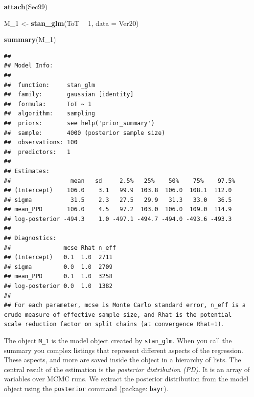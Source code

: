 \documentclass[]{svmono}
\newenvironment{Shaded}{\begin{snugshade}}{\end{snugshade}}
\newcommand{\KeywordTok}[1]{\textcolor[rgb]{0.13,0.29,0.53}{\textbf{#1}}}
\newcommand{\DataTypeTok}[1]{\textcolor[rgb]{0.13,0.29,0.53}{#1}}
\newcommand{\DecValTok}[1]{\textcolor[rgb]{0.00,0.00,0.81}{#1}}
\newcommand{\StringTok}[1]{\textcolor[rgb]{0.31,0.60,0.02}{#1}}
\newcommand{\OperatorTok}[1]{\textcolor[rgb]{0.81,0.36,0.00}{\textbf{#1}}}
\newcommand{\NormalTok}[1]{#1}
\theoremstyle{definition}
\theoremstyle{definition}
\theoremstyle{definition}
\theoremstyle{remark}
\begin{document}
\begin{Shaded}
\begin{Highlighting}[]
\KeywordTok{attach}\NormalTok{(Sec99)}
\end{Highlighting}
\end{Shaded}

\begin{Shaded}
\begin{Highlighting}[]
\NormalTok{M_}\DecValTok{1}\NormalTok{ <-}\StringTok{ }\KeywordTok{stan_glm}\NormalTok{(ToT }\OperatorTok{~}\StringTok{ }\DecValTok{1}\NormalTok{, }\DataTypeTok{data =}\NormalTok{ Ver20)}
\end{Highlighting}
\end{Shaded}

\begin{Shaded}
\begin{Highlighting}[]
\KeywordTok{summary}\NormalTok{(M_}\DecValTok{1}\NormalTok{)}
\end{Highlighting}
\end{Shaded}

\begin{verbatim}
## 
## Model Info:
## 
##  function:     stan_glm
##  family:       gaussian [identity]
##  formula:      ToT ~ 1
##  algorithm:    sampling
##  priors:       see help('prior_summary')
##  sample:       4000 (posterior sample size)
##  observations: 100
##  predictors:   1
## 
## Estimates:
##                 mean   sd     2.5%   25%    50%    75%    97.5%
## (Intercept)    106.0    3.1   99.9  103.8  106.0  108.1  112.0 
## sigma           31.5    2.3   27.5   29.9   31.3   33.0   36.5 
## mean_PPD       106.0    4.5   97.2  103.0  106.0  109.0  114.9 
## log-posterior -494.3    1.0 -497.1 -494.7 -494.0 -493.6 -493.3 
## 
## Diagnostics:
##               mcse Rhat n_eff
## (Intercept)   0.1  1.0  2711 
## sigma         0.0  1.0  2709 
## mean_PPD      0.1  1.0  3258 
## log-posterior 0.0  1.0  1382 
## 
## For each parameter, mcse is Monte Carlo standard error, n_eff is a crude measure of effective sample size, and Rhat is the potential scale reduction factor on split chains (at convergence Rhat=1).
\end{verbatim}

The object \texttt{M\_1} is the model object created by
\texttt{stan\_glm}. When you call the summary you complex listings that
represent different aspects of the regression. These aspects, and more
are saved inside the object in a hierarchy of lists. The central result
of the estimation is the \emph{posterior distribution (PD)}. It is an
array of variables over MCMC runs. We extract the posterior distribution
from the model object using the \texttt{posterior} command (package:
\texttt{bayr}).
\end{document}
